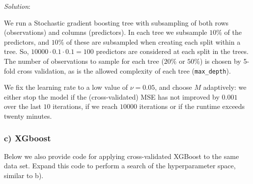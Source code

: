 \documentclass[
]{article}
\newenvironment{Shaded}{\begin{snugshade}}{\end{snugshade}}
\newcommand{\AttributeTok}[1]{\textcolor[rgb]{0.13,0.29,0.53}{#1}}
\newcommand{\CommentTok}[1]{\textcolor[rgb]{0.56,0.35,0.01}{\textit{#1}}}
\newcommand{\ConstantTok}[1]{\textcolor[rgb]{0.56,0.35,0.01}{#1}}
\newcommand{\DecValTok}[1]{\textcolor[rgb]{0.00,0.00,0.81}{#1}}
\newcommand{\FloatTok}[1]{\textcolor[rgb]{0.00,0.00,0.81}{#1}}
\newcommand{\FunctionTok}[1]{\textcolor[rgb]{0.13,0.29,0.53}{\textbf{#1}}}
\newcommand{\NormalTok}[1]{#1}
\newcommand{\OtherTok}[1]{\textcolor[rgb]{0.56,0.35,0.01}{#1}}
\newcommand{\SpecialCharTok}[1]{\textcolor[rgb]{0.81,0.36,0.00}{\textbf{#1}}}
\begin{document}
\emph{Solution}:

We run a Stochastic gradient boosting tree with subsampling of both rows
(observations) and columns (predictors). In each tree we subsample
\(10\)\% of the predictors, and \(10\)\% of these are subsampled when
creating each split within a tree. So,
\(10 000 \cdot 0.1\cdot 0.1 = 100\) predictors are considered at each
split in the trees. The number of observations to sample for each tree
(\(20\)\% or \(50\)\%) is chosen by 5-fold cross validation, as is the
allowed complexity of each tree (\texttt{max\_depth}).

We fix the learning rate to a low value of \(\nu = 0.05\), and choose
\(M\) adaptively: we either stop the model if the (cross-validated) MSE
has not improved by \(0.001\) over the last \(10\) iterations, if we
reach \(10000\) iterations or if the runtime exceeds twenty minutes.

\hypertarget{c-xgboost}{%
\subsubsection{c) XGboost}\label{c-xgboost}}

Below we also provide code for applying cross-validated XGBoost to the
same data set. Expand this code to perform a search of the
hyperparameter space, similar to b).

\begin{Shaded}
\end{Shaded}
\end{document}
